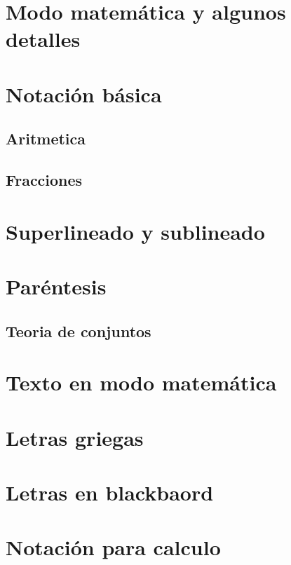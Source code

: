 \documentclass[../notes.tex]{subfiles}
\begin{document}
    \section{Modo matemática y algunos detalles}
    
    \section{Notación básica}
        \subsection{Aritmetica}
        
        \subsection{Fracciones}
        
    \section{Superlineado y sublineado}
    
    \section{Paréntesis}
    
        \subsection{Teoria de conjuntos}
        
        
    \section{Texto en modo matemática}
    
    \section{Letras griegas}
    
    \section{Letras en blackbaord}
    
    \section{Notación para calculo}
        
\end{document}
